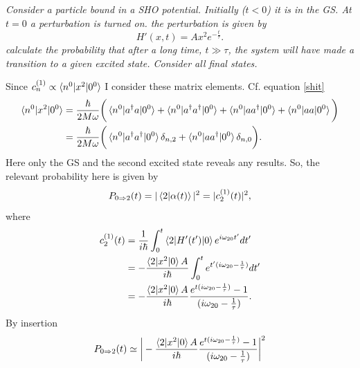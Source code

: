 \begin{example}
	\emph{Consider a particle bound in a SHO potential. Initially ($t<0$) it is in the GS. At $t=0$ a perturbation is turned on. the perturbation is given by}
	\begin{equation}
		H'(x,t)=Ax^2e^{-\frac{t}{\tau}}.
	\end{equation} 
	\emph{calculate the probability that after a long time, $t\gg\tau$, the system will have made a transition to a given excited state. Consider all final states.}\newline
	
	Since $c_n^{(1)}\propto \braket{n^0|x^2|0^0}$ I consider these matrix elements. Cf. equation \eqref{shit}
	\begin{equation}
		\begin{split}
			\braket{n^0|x^2|0^0}&=\frac{\hbar}{2M\omega}\bigg(\braket{n^0|a^\dagger a|0^0}+\braket{n^0|a^\dagger a^\dagger|0^0}+\braket{n^0|aa^\dagger|0^0}+\braket{n^0|aa|0^0}\bigg)\\
			&=\frac{\hbar}{2M\omega}\bigg(\braket{n^0|a^\dagger a^\dagger|0^0}\delta_{n,2}+\braket{n^0|aa^\dagger|0^0}\delta_{n,0}\bigg).\\
		\end{split}
	\end{equation} 
	Here only the GS and the second excited state reveals any results. So, the relevant probability here is given by
	\begin{equation}
		P_{0\Rightarrow 2}(t)=|\braket{2|\alpha(t)}|^2=|c_2^{(1)}(t)|^2,
	\end{equation} 
	where
	\begin{equation}
		\begin{split}
			c_2^{(1)}(t)&=\frac{1}{i\hbar}\int_{0}^{t}\braket{2|H'(t')|0}e^{i\omega_{20}t'}dt'\\
			&=-\frac{\braket{2|x^2|0}A}{i\hbar}\int_{0}^{t}e^{t'(i\omega_{20}-\frac{1}{\tau})}dt'\\
			&=-\frac{\braket{2|x^2|0}A}{i\hbar}\frac{e^{t(i\omega_{20}-\frac{1}{\tau})}-1}{(i\omega_{20}-\frac{1}{\tau})}.\\
		\end{split}
	\end{equation} 
	By insertion
	\begin{equation}
		\begin{split}
			P_{0\Rightarrow 2}(t)&\simeq\bigg|-\frac{\braket{2|x^2|0}A}{i\hbar}\frac{e^{t(i\omega_{20}-\frac{1}{\tau})}-1}{(i\omega_{20}-\frac{1}{\tau})}\bigg|^2\\

\end{split}
\end{equation}
\end{example}
